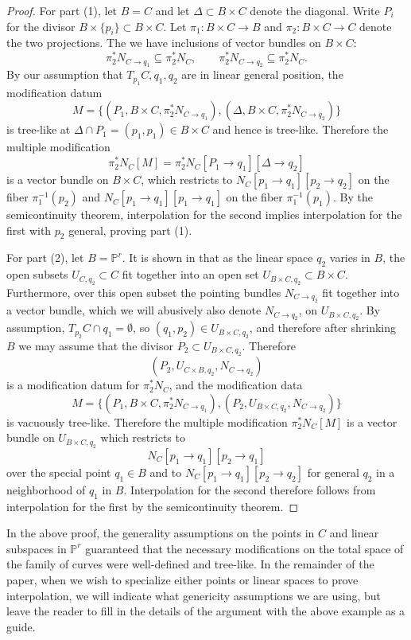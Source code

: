 \documentclass[11pt]{amsart}
\newcommand{\pp}{\mathbb{P}}
\theoremstyle{definition}
\theoremstyle{remark}
\begin{document}
\begin{proof}
For part (1), let $B = C$ and let $\Delta \subset B \times C$ denote the diagonal.  Write $P_i$ for the divisor $B \times \{p_i\} \subset B \times C$.  Let $\pi_1 \colon B \times C \to B$ and $\pi_2 \colon B \times C \to C$ denote the two projections.  The we have inclusions of vector bundles on $B \times C$:
\[\pi_2^*N_{C \to q_1} \subseteq \pi_2^*N_{C}, \qquad \pi_2^*N_{C \to q_2} \subseteq \pi_2^*N_{C}.\]
By our assumption that $T_{p_1}C, q_1, q_2$ are in linear general position, the modification datum 
\[M = \{(P_1, B \times C, \pi_2^*N_{C \to q_1} ), (\Delta, B \times C, \pi_2^*N_{C \to q_2}) \} \]
is tree-like at $\Delta \cap P_1 = (p_1, p_1) \in B \times C$ and hence is tree-like.  Therefore the multiple modification
\[\pi_2^*N_C[M] = \pi_2^*N_C[P_1 \to q_1][\Delta \to q_2] \]
is a vector bundle on $B \times C$, which restricts to $N_C[p_1 \to q_1][p_2 \to q_2]$ on the fiber $\pi_1^{-1}(p_2)$ and $N_C[p_1 \to q_1][p_1 \to q_1]$ on the fiber $\pi_1^{-1}(p_1)$.   By the semicontinuity theorem, interpolation for the second implies interpolation for the first with $p_2$ general, proving part (1).

For part (2), let $B =\pp^r$.
It is shown in \cite[Section 5]{joint} that as the linear space $q_2$ varies in $B$, the open subsets $U_{C, q_2} \subset C$ fit together into an open set $U_{B \times C, q_2} \subset B \times C$.  Furthermore, over this open subset the pointing bundles $N_{C \to q_2}$ fit together into a vector bundle, which we will abusively also denote $N_{C \to q_2}$, on $U_{B \times C, q_2}$.  By assumption, $T_{p_2}C \cap q_1 = \emptyset$, so $(q_1, p_2) \in U_{B \times C, q_2}$, and therefore after shrinking $B$ we may assume that the divisor $P_2 \subset U_{B \times C, q_2}$.  Therefore
\[(P_2, U_{C \times B, q_2}, N_{C \to q_2}) \]
is a modification datum for $\pi_2^*N_C$, and the modification data
\[M = \{(P_1, B \times C, \pi_2^* N_{C \to q_1}), (P_2, U_{B \times C, q_2}, N_{C \to q_2})\} \]
is vacuously tree-like.  Therefore the multiple modification $\pi_2^*N_C[M]$ is a vector bundle on $U_{B \times C, q_2}$ which restricts to 
\[N_C[p_1 \to q_1][p_2 \to q_1] \]
over the special point $q_1 \in B$ and to $N_C[p_1 \to q_1][p_2\to q_2]$ for general $q_2$ in a neighborhood of $q_1$ in $B$.  Interpolation for the second therefore follows from interpolation for the first by the semicontinuity theorem.
\end{proof}

In the above proof, the generality assumptions on the points in $C$ and linear subspaces in $\pp^r$ guaranteed that the necessary modifications on the total space of the family of curves were well-defined and tree-like.  In the remainder of the paper, when we wish to specialize either points or linear spaces to prove interpolation, we will indicate what genericity assumptions we are using, but leave the reader to fill in the details of the argument with the above example as a guide.
\end{document}
